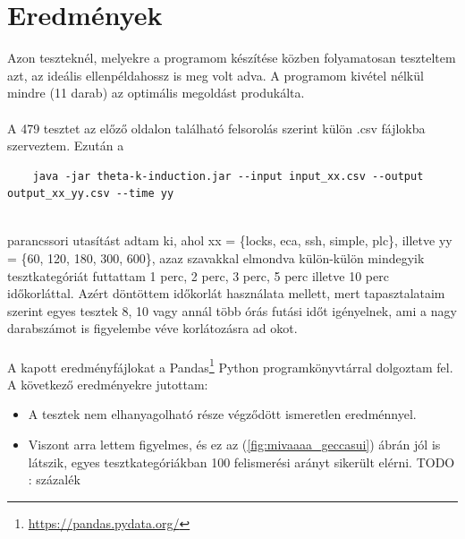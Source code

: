 \section{Eredmények}
\label{sec:kiertekeles_ered}

Azon teszteknél, melyekre a programom készítése közben folyamatosan teszteltem azt, az ideális ellenpéldahossz is meg volt adva. A programom kivétel nélkül mindre (11 darab) az optimális megoldást produkálta. 
\\
\\
A 479 tesztet az előző oldalon található felsorolás szerint külön .csv fájlokba szerveztem. Ezután a 
\ \\
\begin{lstlisting}
	java -jar theta-k-induction.jar --input input_xx.csv --output output_xx_yy.csv --time yy
\end{lstlisting}
\ \\
parancssori utasítást adtam ki, ahol xx = \{locks, eca, ssh, simple, plc\}, illetve yy = \{60, 120, 180, 300, 600\}, azaz szavakkal elmondva külön-külön mindegyik tesztkategóriát futtattam 1 perc, 2 perc, 3 perc, 5 perc illetve 10 perc időkorláttal. Azért döntöttem időkorlát használata mellett, mert tapasztalataim szerint egyes tesztek 8, 10 vagy annál több órás futási időt igényelnek, ami a nagy darabszámot is figyelembe véve korlátozásra ad okot. 
\\
\\
A kapott eredményfájlokat a Pandas\footnote{\url{https://pandas.pydata.org/}} Python programkönyvtárral dolgoztam fel. A következő eredményekre jutottam:

\begin{itemize}
	\item A tesztek nem elhanyagolható része végződött ismeretlen eredménnyel.
	\item Viszont arra lettem figyelmes, és ez az (\ref{fig:mivaaaa_geccasui}) ábrán jól is látszik, egyes tesztkategóriákban 100 felismerési arányt sikerült elérni. TODO : százalék
\end{itemize}

